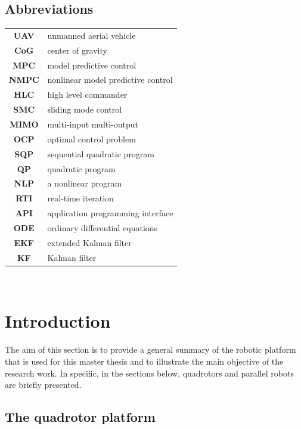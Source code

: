 \documentclass{thesisreport}
\begin{document}
  \section*{Abbreviations}
 \begin{tabular}{cp{}}
  \textbf{UAV} & unmanned aerial vehicle \\
  \textbf{CoG} & center of gravity \\
  \textbf{MPC} & model predictive control \\
  \textbf{NMPC} & nonlinear model predictive control \\
  \textbf{HLC} & high level commander \\
  \textbf{SMC} & sliding mode control \\
  \textbf{MIMO} & multi-input multi-output \\
  \textbf{OCP} & optimal control problem \\
  \textbf{SQP} & sequential quadratic program \\
  \textbf{QP} & quadratic program \\
  \textbf{NLP} & a nonlinear program \\
  \textbf{RTI} & real-time iteration \\
  \textbf{API} & application programming interface \\
  \textbf{ODE} & ordinary differential equations \\
  \textbf{EKF} & extended Kalman filter \\
  \textbf{KF} & Kalman filter \\
  
  
 \end{tabular}\\
 \newpage
 
 \listoffigures
 
\listoftables
 
 \tableofcontents
 
 
 \chapter*{Introduction}
 The aim of this section is to provide a general summary of the robotic platform that is used for this master thesis and to illustrate the main objective of the research work.
In specific, in the sections below, quadrotors and parallel robots are briefly presented.

 \section*{The quadrotor platform}
\end{document}
